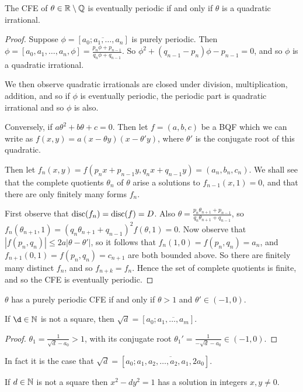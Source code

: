 \documentclass[10pt,a4paper]{article}
\begin{document}
\begin{theorem}[Lagrange]
The CFE of $\theta \in \mathbb{R}\setminus \mathbb{Q}$ is eventually periodic if and only if $\theta$ is a quadratic irrational.
\end{theorem}
\begin{proof}
Suppose $\phi = [\overline{a_0;a_1,\ldots,a_n}]$ is purely periodic. Then $\phi = [a_0,a_1,\ldots,a_n,\phi] = \frac{p_n \phi + p_{n-1}}{q_n \phi + q_{n-1}}$. So $\phi^2 + (q_{n-1}-p_n)\phi-p_{n-1} = 0$, and so $\phi$ is a quadratic irrational.

We then observe quadratic irrationals are closed under division, multiplication, addition, and so if $\phi$ is eventually periodic, the periodic part is quadratic irrational and so $\phi$ is also.

Conversely, if $a\theta^2+b\theta+c=0$. Then let $f = (a,b,c)$ be a BQF which we can write as $f(x,y) = a(x-\theta y)(x-\theta'y)$, where $\theta'$ is the conjugate root of this quadratic.

Then let $f_n(x,y) = f(p_nx+p_{n-1}y, q_nx+q_{n-1}y) = (a_n,b_n,c_n)$. We shall see that the complete quotients $\theta_n$ of $\theta$ arise a solutions to $f_{n-1}(x,1)=0$, and that there are only finitely many forms $f_n$.

First observe that $\operatorname{disc}(f_n) = \operatorname{disc}(f) = D$. Also $\theta = \frac{p_n\theta_{n+1}+p_{n-1}}{q_n\theta_{n+1}+q_{n-1}}$, so $f_n(\theta_{n+1},1) = (q_n\theta_{n+1}+q_{n-1})^2f(\theta,1) = 0$. Now observe that $|f(p_n,q_n)| \leq 2a|\theta-\theta'|$, so it follows that $f_n(1,0) = f(p_n,q_n) = a_n$, and $f_{n+1}(0,1) = f(p_n,q_n) = c_{n+1}$ are both bounded above. So there are finitely many distinct $f_n$, and so $f_{n+k} = f_n$. Hence the set of complete quotients is finite, and so the CFE is eventually periodic.
\end{proof}
\begin{theorem}[Galois]
$\theta$ has a purely periodic CFE if and only if $\theta > 1$ and $\theta' \in (-1,0)$.
\end{theorem}
\begin{corollary}
If $\d \in \N$ is not a square, then $\sqrt{d} = [a_0;\overline{a_1,\ldots,a_m}]$.
\end{corollary}
\begin{proof}
$\theta_1 = \frac{1}{\sqrt{d}-a_0} > 1$, with its conjugate root $\theta_1' = \frac{1}{-\sqrt{d}-a_0} \in (-1,0)$.
\end{proof}
In fact it is the case that $\sqrt{d} = [a_0;\overline{a_1,a_2,\ldots,a_2,a_1,2a_0}]$.
\begin{theorem}
If $d \in \mathbb{N}$ is not a square then $x^2 - dy^2 = 1$ has a solution in integers $x, y \neq 0$.
\end{theorem}
\end{document}
